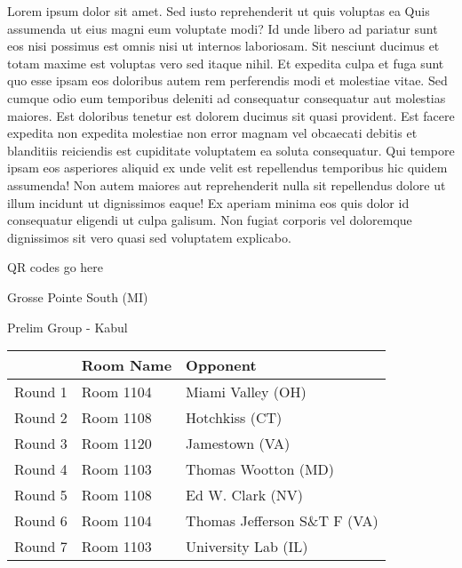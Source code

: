 \documentclass{article}%
\begin{document}
\vspace*{8pt}%
\linebreak%
\newline%
\newline%
Lorem ipsum dolor sit amet. Sed iusto reprehenderit ut quis voluptas ea Quis assumenda ut eius magni eum voluptate modi? Id unde libero ad pariatur sunt eos nisi possimus est omnis nisi ut internos laboriosam. Sit nesciunt ducimus et totam maxime est voluptas vero sed itaque nihil. Et expedita culpa et fuga sunt quo esse ipsam eos doloribus autem rem perferendis modi et molestiae vitae.\newline%
\newline%
Sed cumque odio eum temporibus deleniti ad consequatur consequatur aut molestias maiores. Est doloribus tenetur est dolorem ducimus sit quasi provident. Est facere expedita non expedita molestiae non error magnam vel obcaecati debitis et blanditiis reiciendis est cupiditate voluptatem ea soluta consequatur. Qui tempore ipsam eos asperiores aliquid ex unde velit est repellendus temporibus hic quidem assumenda!\newline%
\newline%
Non autem maiores aut reprehenderit nulla sit repellendus dolore ut illum incidunt ut dignissimos eaque! Ex aperiam minima eos quis dolor id consequatur eligendi ut culpa galisum. Non fugiat corporis vel doloremque dignissimos sit vero quasi sed voluptatem explicabo.\newline%
\newline%
%
\vspace*{30pt}%
\begin{center}%
\begin{Huge}%
QR codes go here%
\end{Huge}%
\end{center}%
\newpage%
%
\begin{center}%
\begin{Huge}%
Grosse Pointe South (MI)%
\end{Huge}%
\vspace*{8pt}%
\linebreak%
\begin{Large}%
Prelim Group {-} Kabul%
\end{Large}%
\end{center}%
\begin{tabularx}{\textwidth}{|c|Y|Y|}%
\hline%
&Room Name&Opponent\\%
\hline%
Round 1&Room 1104&Miami Valley (OH)\\%
Round 2&Room 1108&Hotchkiss (CT)\\%
Round 3&Room 1120&Jamestown (VA)\\%
Round 4&Room 1103&Thomas Wootton (MD)\\%
Round 5&Room 1108&Ed W. Clark (NV)\\%
Round 6&Room 1104&Thomas Jefferson S\&T F (VA)\\%
Round 7&Room 1103&University Lab (IL)\\%
\hline%
\end{tabularx}%
\end{document}

